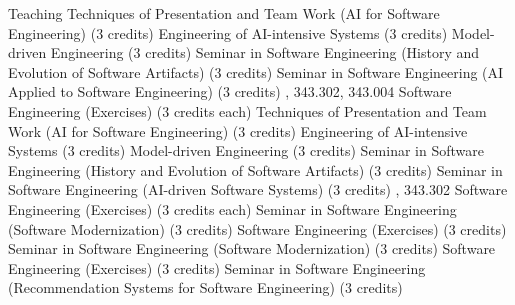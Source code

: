 \begin{rubric}{Teaching}
 Techniques of Presentation and Team Work (AI for Software Engineering) (3 credits)
 Engineering of AI-intensive Systems (3 credits)
 Model-driven Engineering (3 credits)
 Seminar in Software Engineering (History and Evolution of Software Artifacts) (3 credits)
 Seminar in Software Engineering (AI Applied to Software Engineering) (3 credits)
, 343.302, 343.004 Software Engineering (Exercises) (3 credits each) 
 Techniques of Presentation and Team Work (AI for Software Engineering) (3 credits)
 Engineering of AI-intensive Systems (3 credits)
 Model-driven Engineering (3 credits)
 Seminar in Software Engineering (History and Evolution of Software Artifacts) (3 credits)
 Seminar in Software Engineering (AI-driven Software Systems) (3 credits)
, 343.302 Software Engineering (Exercises) (3 credits each) 
 Seminar in Software Engineering (Software Modernization) (3 credits)
 Software Engineering (Exercises) (3 credits)
 Seminar in Software Engineering (Software Modernization) (3 credits)
 Software Engineering (Exercises) (3 credits)
 Seminar in Software Engineering (Recommendation Systems for Software Engineering) (3 credits)


\end{rubric}